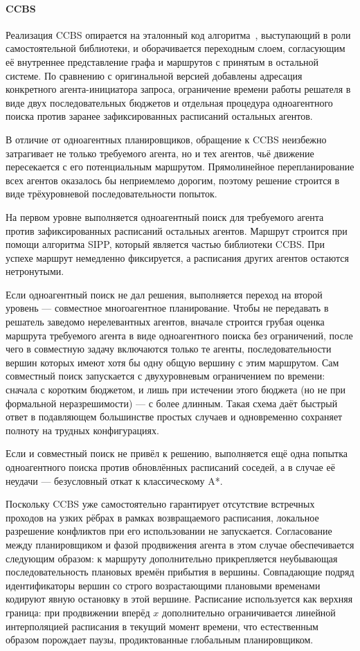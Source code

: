 \paragraph{CCBS}

Реализация CCBS опирается на эталонный код алгоритма~\cite{ccbs-code}, выступающий в роли
самостоятельной библиотеки, и оборачивается переходным слоем, согласующим её внутреннее
представление графа и маршрутов с принятым в остальной системе. По сравнению с оригинальной
версией добавлены адресация конкретного агента-инициатора запроса, ограничение времени работы
решателя в виде двух последовательных бюджетов и отдельная процедура одноагентного поиска
против заранее зафиксированных расписаний остальных агентов.

В отличие от одноагентных планировщиков, обращение к CCBS неизбежно затрагивает не только
требуемого агента, но и тех агентов, чьё движение пересекается с его потенциальным маршрутом.
Прямолинейное перепланирование всех агентов оказалось бы неприемлемо дорогим, поэтому
решение строится в виде трёхуровневой последовательности попыток.

На первом уровне выполняется одноагентный поиск для требуемого агента против зафиксированных
расписаний остальных агентов. Маршрут строится при помощи алгоритма SIPP, который является частью библиотеки CCBS.
При успехе маршрут немедленно фиксируется, а расписания других агентов остаются
нетронутыми.

Если одноагентный поиск не дал решения, выполняется переход на второй уровень --- совместное
многоагентное планирование. Чтобы не передавать в решатель заведомо нерелевантных агентов,
вначале строится грубая оценка маршрута требуемого агента в виде одноагентного поиска без ограничений,
после чего в совместную задачу включаются только те агенты, последовательности вершин которых
имеют хотя бы одну общую вершину с этим маршрутом. Сам совместный поиск запускается с
двухуровневым ограничением по времени: сначала с коротким бюджетом, и лишь при истечении
этого бюджета (но не при формальной неразрешимости) --- с более длинным. Такая схема даёт
быстрый ответ в подавляющем большинстве простых случаев и одновременно сохраняет полноту на
трудных конфигурациях.

Если и совместный поиск не привёл к решению, выполняется ещё одна попытка одноагентного поиска
против обновлённых расписаний соседей, а в случае её неудачи --- безусловный откат к
классическому A*.

Поскольку CCBS уже самостоятельно гарантирует отсутствие встречных проходов на узких рёбрах
в рамках возвращаемого расписания, локальное разрешение конфликтов при его использовании
не запускается. Согласование между планировщиком и фазой продвижения агента в этом случае
обеспечивается следующим образом: к маршруту дополнительно прикрепляется неубывающая
последовательность плановых времён прибытия в вершины. Совпадающие подряд идентификаторы
вершин со строго возрастающими плановыми временами кодируют явную остановку в этой вершине.
Расписание используется как верхняя граница: при продвижении вперёд $x$ дополнительно
ограничивается линейной интерполяцией расписания в текущий
момент времени, что естественным образом порождает паузы, продиктованные глобальным
планировщиком.

